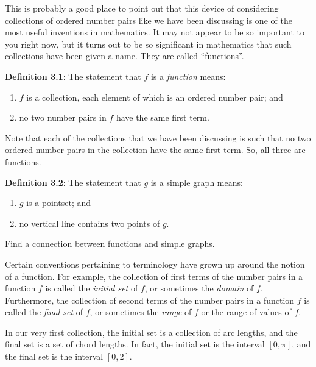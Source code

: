 \documentclass[english]{book}
\begin{document}
This is probably a good place to point out that this device of considering collections of ordered number pairs like we have been discussing is one of the most useful inventions in mathematics. It may not appear to be so important to you right now, but it turns out to be so significant in mathematics that such collections have been given a name. They are called ``functions''.

\vspace{0.3cm}

\textbf{Definition 3.1}: The statement that $f$ is a \emph{function} means:
\begin{enumerate}[\hspace{1cm}1)]
  \item $f$ is a collection, each element of which is an ordered number pair; and
  \item no two number pairs in $f$ have the same first term.
\end{enumerate}
Note that each of the collections that we have been discussing is such that no two ordered number pairs in the collection have the same first term. So, all three are functions.

\vspace{0.3cm}

\textbf{Definition 3.2}: The statement that $g$ is a simple graph means:
\begin{enumerate}[\hspace{1cm}1)]
  \item $g$ is a pointset; and
  \item no vertical line contains two points of $g$.
\end{enumerate}
Find a connection between functions and simple graphs.

\vspace{0.3cm}

Certain conventions pertaining to terminology have grown up around the notion of a function. For example, the collection of first terms of the number pairs in a function $f$ is called the \emph{initial set} of $f$, or sometimes the \emph{domain} of $f$. Furthermore, the collection of second terms of the number pairs in a function $f$ is called the \emph{final set} of $f$, or sometimes the \emph{range} of $f$ or the range of values of $f$.

In our very first collection, the initial set is a collection of arc lengths, and the final set is a set of chord lengths. In fact, the initial set is the interval $[0,\pi]$, and the final set is the interval $[0,2]$.
\end{document}
